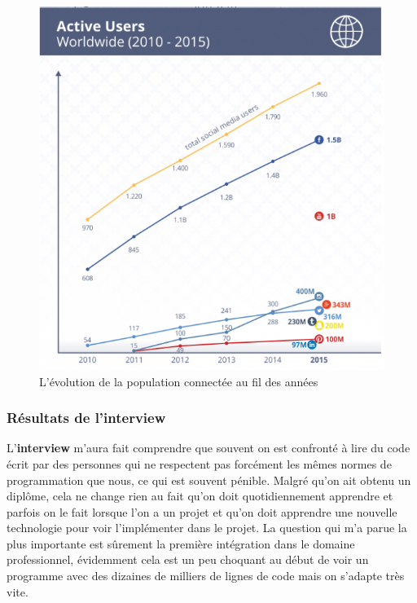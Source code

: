 \documentclass[11pt]{article}
\begin{document}
\begin{onehalfspace}
\begin{description}
\begin{figure}[h]
\begin{center}
					\includegraphics[scale=0.5]{sociaux.png}
				\end{center}
			\caption{L'évolution de la population connectée au fil des années\cite{evolution}}
			\label{L'évolution de la population connectée au fil des années}
			\end{figure}
		\end{description}
		\subsubsection{Résultats de l'interview}
		L'\textbf{interview} m'aura fait comprendre que souvent on est confronté à lire du code écrit par des personnes qui ne respectent pas forcément les mêmes normes de programmation que nous, ce qui est souvent pénible. Malgré qu'on ait obtenu un diplôme, cela ne change rien au fait qu'on doit quotidiennement apprendre et parfois on le fait lorsque l'on a un projet et qu'on doit apprendre une nouvelle technologie pour voir l'implémenter dans le projet. La question qui m'a parue la plus importante est sûrement la première intégration dans le domaine professionnel, évidemment cela est un peu choquant au début de voir un programme avec des dizaines de milliers de lignes de code mais on s'adapte très vite.
		

\end{onehalfspace}
\end{document}
